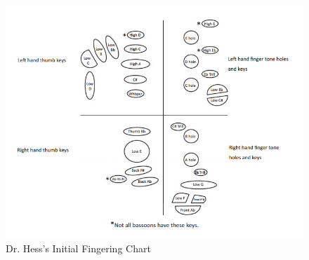 \documentclass[12pt,english]{article}
\begin{document}
\begin{figure}[H]
\caption{Dr. Hess's Initial Fingering Chart}


\begin{centering}
\includegraphics[scale=0.6]{susan_fingerings}
\par\end{centering}

\end{figure}
\end{document}
